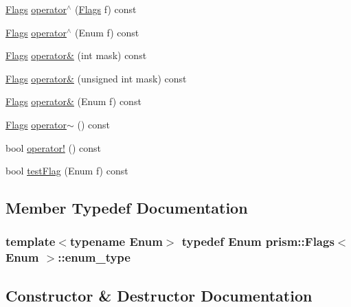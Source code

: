 \begin{DoxyCompactItemize}
\item 
\hyperlink{classprism_1_1_flags}{Flags} \hyperlink{classprism_1_1_flags_a63842ee8385e25893f0371387fbaae79}{operator$^\wedge$} (\hyperlink{classprism_1_1_flags}{Flags} f) const 
\item 
\hyperlink{classprism_1_1_flags}{Flags} \hyperlink{classprism_1_1_flags_a558ac268c605264e2379f022bab918f3}{operator$^\wedge$} (Enum f) const 
\item 
\hyperlink{classprism_1_1_flags}{Flags} \hyperlink{classprism_1_1_flags_a3db41a3026096495b17362cd78a84321}{operator\&} (int mask) const 
\item 
\hyperlink{classprism_1_1_flags}{Flags} \hyperlink{classprism_1_1_flags_ad1b35e1f4b8a12280fd44dda7ecf1106}{operator\&} (unsigned int mask) const 
\item 
\hyperlink{classprism_1_1_flags}{Flags} \hyperlink{classprism_1_1_flags_ab00e2ffaa70a3a679cd85d796eabbcec}{operator\&} (Enum f) const 
\item 
\hyperlink{classprism_1_1_flags}{Flags} \hyperlink{classprism_1_1_flags_a758fe3b9fe01e30804061f113eccd5fc}{operator$\sim$} () const 
\item 
bool \hyperlink{classprism_1_1_flags_a26c98a1f975fe23771992e9c6ad190e7}{operator!} () const 
\item 
bool \hyperlink{classprism_1_1_flags_af7ea559d83cf7a5374a08747311d9efe}{test\+Flag} (Enum f) const 
\end{DoxyCompactItemize}


\subsection{Member Typedef Documentation}
\subsubsection[{\texorpdfstring{enum\+\_\+type}{enum_type}}]{\setlength{\rightskip}{0pt plus 5cm}template$<$typename Enum$>$ typedef Enum {\bf prism\+::\+Flags}$<$ Enum $>$\+::{\bf enum\+\_\+type}}\hypertarget{classprism_1_1_flags_a2415ba62bc10f8590955edcb9c738e5b}{}\label{classprism_1_1_flags_a2415ba62bc10f8590955edcb9c738e5b}


\subsection{Constructor \& Destructor Documentation}
